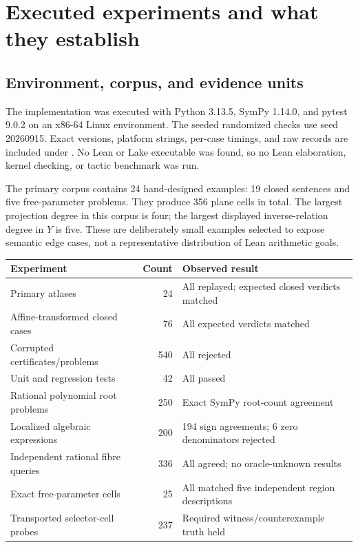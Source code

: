 \section{Executed experiments and what they establish}
\label{sec:experiments}
\subsection{Environment, corpus, and evidence units}
The implementation was executed with Python 3.13.5, SymPy 1.14.0, and pytest 9.0.2 on an x86-64 Linux environment. The seeded randomized checks use seed 20260915. Exact versions, platform strings, per-case timings, and raw records are included under . No Lean or Lake executable was found, so no Lean elaboration, kernel checking, or tactic benchmark was run.

The primary corpus contains 24 hand-designed examples: 19 closed sentences and five free-parameter problems. They produce 356 plane cells in total. The largest projection degree in this corpus is four; the largest displayed inverse-relation degree in $Y$ is five. These are deliberately small examples selected to expose semantic edge cases, not a representative distribution of Lean arithmetic goals.

\begin{center}
\begin{tabular}{p{}r p{}}
\toprule
Experiment & Count & Observed result\\
\midrule
Primary atlases & 24 & All replayed; expected closed verdicts matched\\
Affine-transformed closed cases & 76 & All expected verdicts matched\\
Corrupted certificates/problems & 540 & All rejected\\
Unit and regression tests & 42 & All passed\\
Rational polynomial root problems & 250 & Exact SymPy root-count agreement\\
Localized algebraic expressions & 200 & 194 sign agreements; 6 zero denominators rejected\\
Independent rational fibre queries & 336 & All agreed; no oracle-unknown results\\
Exact free-parameter cells & 25 & All matched five independent region descriptions\\
Transported selector-cell probes & 237 & Required witness/counterexample truth held\\
\bottomrule
\end{tabular}
\end{center}

